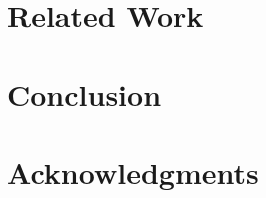 \documentclass{sig-alternate-05-2015}
\begin{document}
\section{Related Work}
\label{sec:relatedwork}


\section{Conclusion}
\label{sec:conclusion}


\section{Acknowledgments}
\label{sec:acknowledgments}



\end{document}
